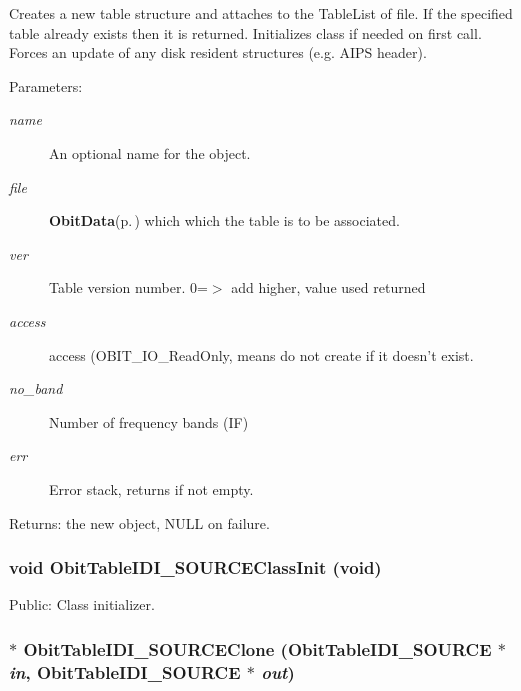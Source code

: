 Creates a new table structure and attaches to the Table\-List of file. If the specified table already exists then it is returned. Initializes class if needed on first call. Forces an update of any disk resident structures (e.g. AIPS header). \begin{Desc}
\item[Parameters:]
\begin{description}
\item[{\em name}]An optional name for the object. \item[{\em file}]{\bf Obit\-Data}{\rm (p.\,\pageref{structObitData})} which which the table is to be associated. \item[{\em ver}]Table version number. 0=$>$ add higher, value used returned \item[{\em access}]access (OBIT\_\-IO\_\-Read\-Only, means do not create if it doesn't exist. \item[{\em no\_\-band}]Number of frequency bands (IF) \item[{\em err}]Error stack, returns if not empty. \end{description}
\end{Desc}
\begin{Desc}
\item[Returns:]the new object, NULL on failure. \end{Desc}
\subsubsection{\setlength{\rightskip}{0pt plus 5cm}void Obit\-Table\-IDI\_\-SOURCEClass\-Init (void)}\label{ObitTableIDI__SOURCE_8h_a10}


Public: Class initializer. 

\subsubsection{$\ast$ Obit\-Table\-IDI\_\-SOURCEClone ({\bf Obit\-Table\-IDI\_\-SOURCE} $\ast$ {\em in}, {\bf Obit\-Table\-IDI\_\-SOURCE} $\ast$ {\em out})}\label{ObitTableIDI__SOURCE_8h_a15}


